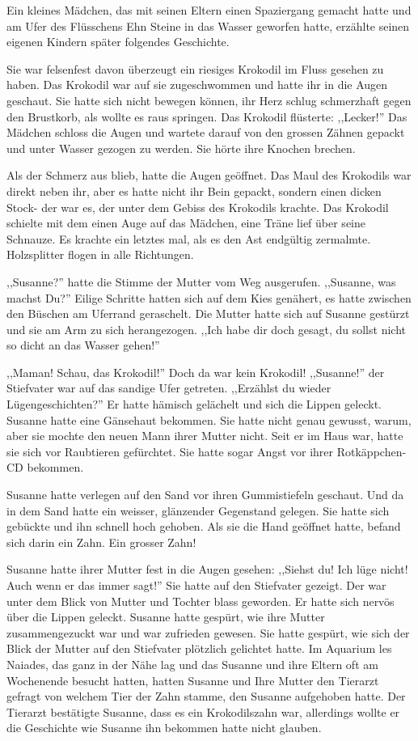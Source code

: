\documentclass[11pt,titlepage,a5paper]{book}
\begin{document}
Ein kleines Mädchen, das mit seinen Eltern einen Spaziergang gemacht hatte und am Ufer des Flüsschens Ehn Steine in das Wasser geworfen hatte, erzählte seinen eigenen Kindern später folgendes Geschichte. 

Sie war felsenfest davon überzeugt ein riesiges Krokodil im Fluss gesehen zu haben. Das Krokodil war auf sie zugeschwommen und hatte ihr in die Augen geschaut. Sie hatte sich nicht bewegen können, ihr Herz schlug schmerzhaft gegen den Brustkorb, als wollte es raus springen. Das Krokodil flüsterte: ,,Lecker!'' Das Mädchen schloss die Augen und wartete darauf von den grossen Zähnen gepackt und unter Wasser gezogen zu werden. Sie hörte ihre Knochen brechen.

Als der Schmerz aus blieb, hatte die Augen geöffnet. Das Maul des Krokodils war direkt neben ihr, aber es hatte nicht ihr Bein gepackt, sondern einen dicken Stock- der war es, der unter dem Gebiss des Krokodils krachte.
Das Krokodil schielte mit dem einen Auge auf das Mädchen, eine Träne lief über seine Schnauze. Es krachte ein letztes mal, als es den Ast endgültig zermalmte. Holzsplitter flogen in alle Richtungen.

,,Susanne?'' hatte die Stimme der Mutter vom Weg ausgerufen. ,,Susanne, was machst Du?'' Eilige Schritte hatten sich auf dem Kies genähert, es hatte zwischen den Büschen am Uferrand geraschelt. Die Mutter hatte sich auf Susanne gestürzt und sie am Arm zu sich herangezogen. ,,Ich habe dir doch gesagt, du sollst nicht so dicht an das Wasser gehen!''

,,Maman! Schau, das Krokodil!''
Doch da war kein Krokodil! ,,Susanne!'' der Stiefvater war auf das sandige Ufer getreten. ,,Erzählst du wieder Lügengeschichten?'' Er hatte hämisch gelächelt und sich die Lippen geleckt. Susanne hatte eine Gänsehaut bekommen. Sie hatte nicht genau gewusst, warum, aber  sie mochte den neuen Mann ihrer Mutter nicht. Seit er im Haus war, hatte sie sich vor Raubtieren gefürchtet. Sie hatte sogar Angst vor ihrer Rotkäppchen-CD bekommen. 

Susanne hatte verlegen auf den Sand vor ihren Gummistiefeln geschaut. Und da in dem Sand hatte ein weisser, glänzender Gegenstand gelegen. Sie hatte sich gebückte und ihn schnell hoch gehoben. Als sie die Hand geöffnet hatte, befand sich darin ein Zahn. Ein grosser Zahn!

Susanne hatte ihrer Mutter fest in die Augen gesehen: ,,Siehst du! Ich lüge nicht! Auch wenn er das immer sagt!'' Sie hatte auf den Stiefvater gezeigt. Der war unter dem Blick von Mutter und Tochter blass geworden. Er hatte sich nervös über die Lippen geleckt. Susanne hatte gespürt, wie ihre Mutter zusammengezuckt war und war zufrieden gewesen. Sie hatte gespürt, wie sich der Blick der Mutter auf den Stiefvater plötzlich gelichtet hatte.
Im Aquarium les Naiades, das ganz in der Nähe lag und das Susanne und ihre Eltern oft am Wochenende besucht hatten, hatten Susanne und Ihre Mutter den Tierarzt gefragt von welchem Tier der Zahn stamme, den Susanne aufgehoben hatte. Der Tierarzt bestätigte Susanne, dass es ein Krokodilszahn war, allerdings wollte er die Geschichte wie Susanne ihn bekommen hatte nicht glauben. 
\end{document}
